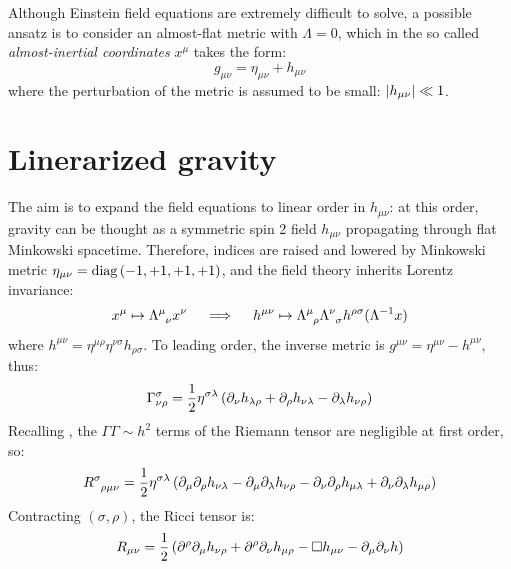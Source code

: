
Although Einstein field equations are extremely difficult to solve, a possible ansatz is to consider an almost-flat metric with $ \Lambda = 0 $, which in the so called \textit{almost-inertial coordinates} $ x^\mu $ takes the form:
\begin{equation}
  g_{\mu \nu} = \eta_{\mu \nu} + h_{\mu \nu}
  \label{eq:weak-metric}
\end{equation}
where the perturbation of the metric is assumed to be small: $ \left\lvert h_{\mu \nu}\right\rvert \ll 1 $.

\section{Linerarized gravity}

The aim is to expand the field equations to linear order in $ h_{\mu \nu} $: at this order, gravity can be thought as a symmetric spin 2 field $ h_{\mu \nu} $ propagating through flat Minkowski spacetime. Therefore, indices are raised and lowered by Minkowski metric $ \eta_{\mu \nu} = \operatorname{diag} \left( -1,+1,+1,+1 \right) $, and the field theory inherits Lorentz invariance:
\begin{equation*}
  x^\mu \mapsto \tensor{\Lambda}{^\mu_\nu} x^\nu
  \quad \implies \quad
  h^{\mu \nu} \mapsto \tensor{\Lambda}{^\mu_\rho} \tensor{\Lambda}{^\nu_\sigma} h^{\rho \sigma} (\Lambda^{-1} x)
\end{equation*}
where $ h^{\mu \nu} = \eta^{\mu \rho} \eta^{\nu \sigma} h_{\rho \sigma} $. To leading order, the inverse metric is $ g^{\mu \nu} = \eta^{\mu \nu} - h^{\mu \nu} $, thus:
\begin{equation}
  \Gamma^\sigma_{\nu \rho} = \frac{1}{2} \eta^{\sigma \lambda} \left( \partial_\nu h_{\lambda \rho} + \partial_\rho h_{\nu \lambda} - \partial_\lambda h_{\nu \rho} \right)
\end{equation}
Recalling , the $ \Gamma \Gamma \sim h^2 $ terms of the Riemann tensor are negligible at first order, so:
\begin{equation}
  \tensor{R}{^\sigma_{\rho \mu \nu}} = \frac{1}{2} \eta^{\sigma \lambda} \left( \pa_\mu \pa_\rho h_{\nu \lambda} - \pa_\mu \pa_\lambda h_{\nu \rho} - \pa_\nu \pa_\rho h_{\mu \lambda} + \pa_\nu \pa_\lambda h_{\mu \rho} \right)
  \label{eq:weak-riem}
\end{equation}
Contracting $ (\sigma,\rho) $, the Ricci tensor is:
\begin{equation}
  R_{\mu \nu} = \frac{1}{2} \left( \partial^\rho \partial_\mu h_{\nu \rho} + \partial^\rho \partial_\nu h_{\mu \rho} - \Box h_{\mu \nu} - \partial_\mu \partial_\nu h \right)
\end{equation}
